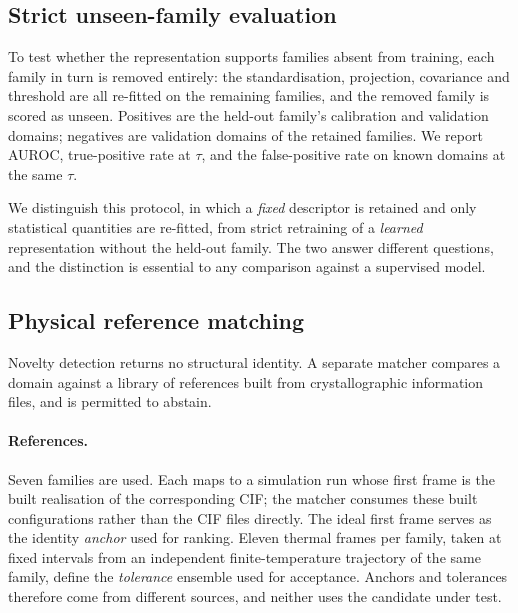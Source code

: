 \subsection{Strict unseen-family evaluation}
\label{sec:lofo}

To test whether the representation supports families absent from training, each family in
turn is removed entirely: the standardisation, projection, covariance and threshold are all
re-fitted on the remaining families, and the removed family is scored as unseen. Positives
are the held-out family's calibration and validation domains; negatives are validation
domains of the retained families. We report AUROC, true-positive rate at $\tau$, and the
false-positive rate on known domains at the same $\tau$.

We distinguish this protocol, in which a \emph{fixed} descriptor is retained and only
statistical quantities are re-fitted, from strict retraining of a \emph{learned}
representation without the held-out family. The two answer different questions, and the
distinction is essential to any comparison against a supervised model.

\subsection{Physical reference matching}
\label{sec:matcher}

Novelty detection returns no structural identity. A separate matcher compares a domain
against a library of references built from crystallographic information files, and is
permitted to abstain.

\paragraph{References.} Seven families are used. Each maps to a simulation run whose first
frame is the built realisation of the corresponding CIF; the matcher consumes these built
configurations rather than the CIF files directly. The ideal first frame serves as the
identity \emph{anchor} used for ranking. Eleven thermal frames per family, taken at fixed
intervals from an independent finite-temperature trajectory of the same family, define the
\emph{tolerance} ensemble used for acceptance. Anchors and tolerances therefore come from
different sources, and neither uses the candidate under test.

